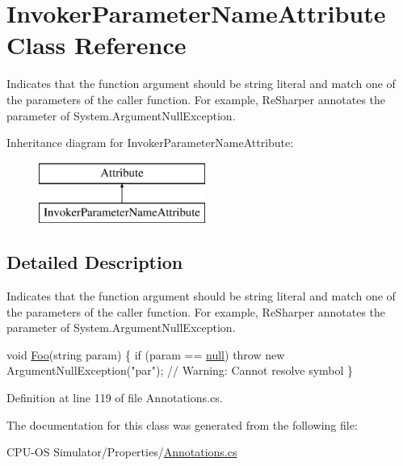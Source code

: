 \hypertarget{class_invoker_parameter_name_attribute}{}\section{Invoker\+Parameter\+Name\+Attribute Class Reference}
\label{class_invoker_parameter_name_attribute}


Indicates that the function argument should be string literal and match one of the parameters of the caller function. For example, Re\+Sharper annotates the parameter of System.\+Argument\+Null\+Exception.  


Inheritance diagram for Invoker\+Parameter\+Name\+Attribute\+:\begin{figure}[H]
\begin{center}
\leavevmode
\includegraphics[height=2.000000cm]{class_invoker_parameter_name_attribute}
\end{center}
\end{figure}


\subsection{Detailed Description}
Indicates that the function argument should be string literal and match one of the parameters of the caller function. For example, Re\+Sharper annotates the parameter of System.\+Argument\+Null\+Exception. 


\begin{DoxyCode}
\textcolor{keywordtype}{void} \hyperlink{_annotations_8cs_a710c2378b43f44cd4a9b365c85be5d6c}{Foo}(\textcolor{keywordtype}{string} param) \{
  \textcolor{keywordflow}{if} (param == \hyperlink{_old_01_process_01_flags_8cs_afb8e110345c45e74478894341ab6b28e}{null})
    \textcolor{keywordflow}{throw} \textcolor{keyword}{new} ArgumentNullException(\textcolor{stringliteral}{"par"}); \textcolor{comment}{// Warning: Cannot resolve symbol}
\}
\end{DoxyCode}


Definition at line 119 of file Annotations.\+cs.



The documentation for this class was generated from the following file\+:\begin{DoxyCompactItemize}
\item 
C\+P\+U-\/\+O\+S Simulator/\+Properties/\hyperlink{_annotations_8cs}{Annotations.\+cs}\end{DoxyCompactItemize}
